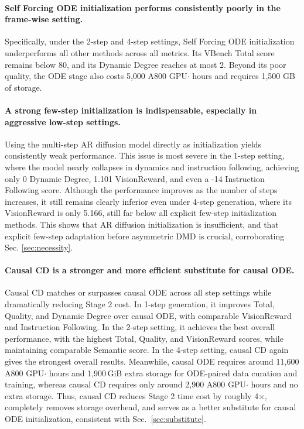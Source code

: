 \documentclass{llmxive}
\begin{document}
\paragraph{Self Forcing ODE initialization performs consistently poorly in the frame-wise setting.} Specifically, under the 2-step and 4-step settings, Self Forcing ODE initialization underperforms all other methods across all metrics. Its VBench Total score remains below 80, and its Dynamic Degree reaches at most 2. Beyond its poor quality, the ODE stage also costs 5,000 A800 GPU$\cdot$ hours and requires 1,500 GB of storage.


\paragraph{A strong few-step initialization is indispensable, especially in aggressive low-step settings.}
Using the multi-step AR diffusion model directly as initialization yields consistently weak performance. This issue is most severe in the 1-step setting, where the model nearly collapses in dynamics and instruction following, achieving only 0 Dynamic Degree, 1.101 VisionReward, and even a -14 Instruction Following score. Although the performance improves as the number of steps increases, it still remains clearly inferior even under 4-step generation, where its VisionReward is only 5.166, still far below all explicit few-step initialization methods. This shows that AR diffusion initialization is insufficient, and that explicit few-step adaptation before asymmetric DMD is crucial, corroborating Sec. \ref{sec:necessity}.

\paragraph{Causal CD is a stronger and more efficient substitute for causal ODE.}
Causal CD matches or surpasses causal ODE across all step settings while dramatically reducing Stage 2 cost. In 1-step generation, it improves Total, Quality, and Dynamic Degree over causal ODE, with comparable VisionReward and Instruction Following. In the 2-step setting, it achieves the best overall performance, with the highest Total, Quality, and VisionReward scores, while maintaining comparable Semantic score. In the 4-step setting, causal CD again gives the strongest overall results. Meanwhile, causal ODE requires around 11,600 A800 GPU$\cdot$ hours and 1,900\,GiB extra storage for ODE-paired data curation and training, whereas causal CD requires only around 2,900 A800 GPU$\cdot$ hours and no extra storage. Thus, causal CD reduces Stage 2 time cost by roughly 4$\times$, completely removes storage overhead, and serves as a better substitute for causal ODE initialization, consistent with Sec.~\ref{sec:substitute}.
\end{document}
